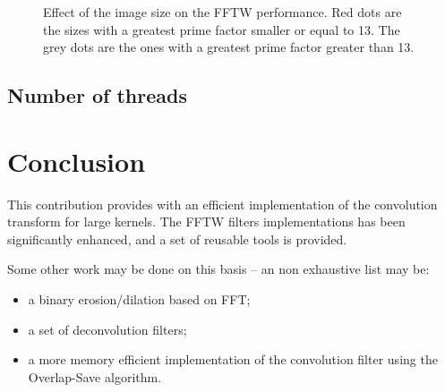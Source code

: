 \documentclass{InsightArticle}
\begin{document}
\begin{figure}[htbp]
\begin{center}
\caption{Effect of the image size on the FFTW performance. Red dots are the sizes with a greatest prime
factor smaller or equal to 13. The grey dots are the ones with a greatest prime factor greater than 13.
\label{fig:perf-fftw3}}
\end{center}
\end{figure}

\subsection{Number of threads}

\section{Conclusion}

This contribution provides with an efficient implementation of the convolution transform for large kernels.
The FFTW filters implementations has been significantly enhanced, and a set of reusable tools is provided.

Some other work may be done on this basis -- an non exhaustive list may be:
\begin{itemize}
 \item a binary erosion/dilation based on FFT;
 \item a set of deconvolution filters;
 \item a more memory efficient implementation of the convolution filter using the Overlap-Save algorithm.
\end{itemize}


\appendix





\nocite{ITKSoftwareGuide}
\end{document}
